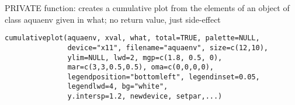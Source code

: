 \documentclass{article}
\begin{document}
\begin{Description}\relax
PRIVATE function: creates a cumulative plot from the elements of an object of class aquaenv given in what; no return value, just side-effect
\end{Description}
\begin{Usage}
\begin{verbatim}cumulativeplot(aquaenv, xval, what, total=TRUE, palette=NULL,
               device="x11", filename="aquaenv", size=c(12,10),
               ylim=NULL, lwd=2, mgp=c(1.8, 0.5, 0),
               mar=c(3,3,0.5,0.5), oma=c(0,0,0,0),
               legendposition="bottomleft", legendinset=0.05,
               legendlwd=4, bg="white",
               y.intersp=1.2, newdevice, setpar,...)\end{verbatim}
\end{Usage}
\end{document}
